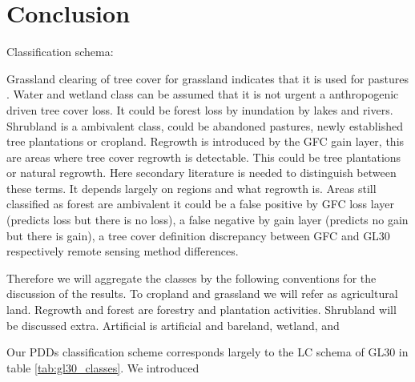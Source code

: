 \chapter{Conclusion}
\label{ch:conclusion}
Classification schema:

Grassland clearing of tree cover for grassland indicates that it is used for pastures . Water and wetland class can be assumed that it is not urgent a anthropogenic driven tree cover loss. It could be forest loss by inundation by lakes and rivers.\cite{Sy2015}
Shrubland is a ambivalent class, could be abandoned pastures, newly established tree plantations or cropland. Regrowth is introduced by the \ac{GFC} gain layer, this are areas where tree cover regrowth is detectable. This could be tree plantations or natural regrowth. Here secondary literature is needed to distinguish between these terms. It depends largely on regions and what regrowth is. Areas still classified as forest are ambivalent it could be a false positive by \ac{GFC} loss layer (predicts loss but there is no loss), a false negative by gain layer (predicts no gain but there is gain), a tree cover definition discrepancy between \ac{GFC} and \ac{GL30} respectively remote sensing method differences.

Therefore we will aggregate the classes by the following conventions for the discussion of the results. To cropland and grassland we will refer as agricultural land. Regrowth and forest are forestry and plantation activities. Shrubland will be discussed extra. Artificial is artificial and bareland, wetland, and 

Our \acp{PDD} classification scheme corresponds largely to the \ac{LC} schema of \ac{GL30} in table \ref{tab:gl30_classes}. We introduced 